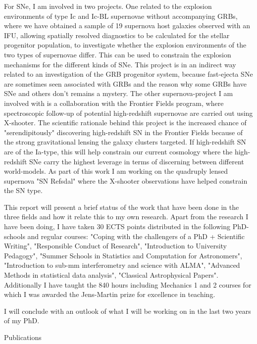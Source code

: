 For SNe, I am involved in two projects. One related to the explosion environments of type Ic and Ic-BL supernovae without accompanying GRBs, where we have obtained a sample of 19 supernova host galaxies observed with an IFU, allowing spatially resolved diagnostics to be calculated for the stellar progenitor population, to investigate whether the explosion environments of the two types of supernovae differ. This can be used to constrain the explosion mechanisms for the different kinds of SNe. This project is in an indirect way related to an investigation of the GRB progenitor system, because fast-ejecta SNe are sometimes seen associated with GRBs and the reason why some GRBs have SNe and others don't remains a mystery. The other supernova-project I am involved with is a collaboration with the Frontier Fields program, where spectroscopic follow-up of potential high-redshift supernovae are carried out using X-shooter. The scientific rationale behind this project is the increased chance of "serendipitously" discovering high-redshift SN in the Frontier Fields because of the strong gravitational lensing the galaxy clusters targeted. If high-redshift SN are of the Ia-type, this will help constrain our current cosmology where the high-redshift SNe carry the highest leverage in terms of discerning between different world-models. As part of this work I am working on the quadruply lensed supernova "SN Refsdal" where the X-shooter observations have helped constrain the SN type.

This report will present a brief status of the work that have been done in the three fields and how it relate this to my own research. Apart from the research I have been doing, I have taken 30 ECTS points distributed in the following PhD-schools and regular courses: "Coping with the challengers of a PhD + Scientific Writing", "Responsible Conduct of Research", "Introduction to University Pedagogy", "Summer Schools in Statistics and Computation for Astronomers", "Introduction to sub-mm interferometry and science with ALMA", "Advanced Methods in statistical data analysis", "Classical Astrophysical Papers". Additionally I have taught the 840 hours including Mechanics 1 and 2 courses for which I was awarded the Jens-Martin prize for excellence in teaching.

I will conclude with an outlook of what I will be working on in the last two years of my PhD. 

\clearpage

{\Large Publications} \\

